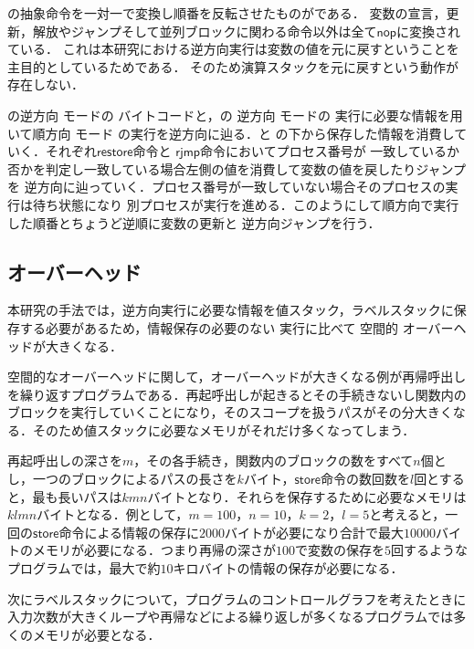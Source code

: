 \documentclass[submit,PRO]{ipsj}
\newcommand{\bcode}[1]{$\mathsf{#1}$}
\begin{document}
の抽象命令を一対一で変換し順番を反転させたものがである．
変数の宣言，更新，解放やジャンプそして並列ブロックに関わる命令以外は全て\bcode{nop}に変換されている．
これは本研究における逆方向実行は変数の値を元に戻すということを主目的としているためである．
そのため演算スタックを元に戻すという動作が存在しない．

の逆方向%
モードの%
バイトコードと，の
逆方向%
モードの%
実行に必要な情報を用いて順方向%
モード%
の実行を逆方向に辿る．と
の下から保存した情報を消費していく．それぞれ\bcode{restore}命令と
\bcode{rjmp}命令においてプロセス番号が
一致しているか否かを判定し一致している場合左側の値を消費して変数の値を戻したりジャンプを
逆方向に辿っていく．プロセス番号が一致していない場合そのプロセスの実行は待ち状態になり
別プロセスが実行を進める．このようにして順方向で実行した順番とちょうど逆順に変数の更新と
逆方向ジャンプを行う．

\subsection{オーバーヘッド} %

本研究の手法では，逆方向実行に必要な情報を値スタック，ラベルスタックに保存する必要があるため，情報保存の必要のない
実行に比べて%
空間的%
オーバーヘッドが大きくなる．

空間的なオーバーヘッドに関して，オーバーヘッドが大きくなる例が再帰呼出しを繰り返すプログラムである．再起呼出しが起きるとその手続きないし関数内のブロックを実行していくことになり，そのスコープを扱うパスがその分大きくなる．そのため値スタックに必要なメモリがそれだけ多くなってしまう．

再起呼出しの深さを$m$，その各手続き，関数内のブロックの数をすべて$n$個とし，一つのブロックによるパスの長さを$k$バイト，\bcode{store}命令の数回数を$l$回とすると，最も長いパスは$kmn$バイトとなり．それらを保存するために必要なメモリは$klmn$バイトとなる．例として，$m=100$，$n=10$，$k=2$，$l=5$と考えると，一回の\bcode{store}命令による情報の保存に$2000$バイトが必要になり合計で最大$10000$バイトのメモリが必要になる．つまり再帰の深さが$100$で変数の保存を$5$回するようなプログラムでは，最大で約$10$キロバイトの情報の保存が必要になる．

次にラベルスタックについて，プログラムのコントロールグラフを考えたときに入力次数が大きくループや再帰などによる繰り返しが多くなるプログラムでは多くのメモリが必要となる．
\end{document}
